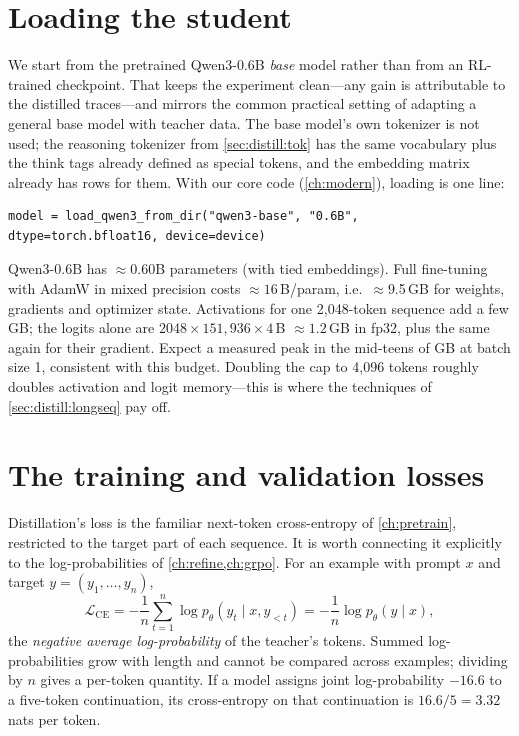 \section{Loading the student}\label{sec:distill:model}

We start from the pretrained Qwen3-0.6B \emph{base} model rather than from an RL-trained
checkpoint. That keeps the experiment clean---any gain is attributable to the distilled
traces---and mirrors the common practical setting of adapting a general base model with
teacher data. The base model's own tokenizer is not used; the reasoning tokenizer from
\cref{sec:distill:tok} has the same vocabulary plus the think tags already defined as special
tokens, and the embedding matrix already has rows for them. With our core code
(\cref{ch:modern}), loading is one line:
\begin{lstlisting}
model = load_qwen3_from_dir("qwen3-base", "0.6B", dtype=torch.bfloat16, device=device)
\end{lstlisting}

\begin{napkinmath}
Qwen3-0.6B has $\approx$0.60B parameters (with tied embeddings). Full fine-tuning with AdamW in
mixed precision costs $\approx 16$\,B/param, i.e.\ $\approx$9.5\,GB for weights, gradients and
optimizer state. Activations for one 2{,}048-token sequence add a few GB; the logits alone are
$2048\times151{,}936\times 4$\,B $\approx 1.2$\,GB in fp32, plus the same again for their gradient.
Expect a measured peak in the mid-teens of GB at batch size 1, consistent with this budget.
Doubling the cap to 4{,}096 tokens roughly doubles activation and logit memory---this is where
the techniques of \cref{sec:distill:longseq} pay off.
\end{napkinmath}

\section{The training and validation losses}\label{sec:distill:loss}

Distillation's loss is the familiar next-token cross-entropy of \cref{ch:pretrain}, restricted to
the target part of each sequence. It is worth connecting it explicitly to the log-probabilities
of \cref{ch:refine,ch:grpo}. For an example with prompt $x$ and target $y=(y_1,\dots,y_n)$,
\begin{equation}
\mathcal{L}_{\text{CE}} = -\frac{1}{n}\sum_{t=1}^{n}\log p_\theta(y_t\mid x, y_{<t})
= -\frac{1}{n}\log p_\theta(y\mid x),
\label{eq:distill:ce}
\end{equation}
the \emph{negative average log-probability} of the teacher's tokens. Summed log-probabilities
grow with length and cannot be compared across examples; dividing by $n$ gives a per-token
quantity. If a model assigns joint log-probability $-16.6$ to a five-token continuation, its
cross-entropy on that continuation is $16.6/5 = 3.32$ nats per token.

